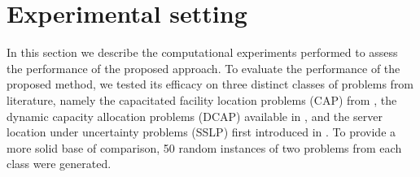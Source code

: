 \documentclass[preprint, 1p, review]{elsarticle}
\begin{document}
%

\section{Experimental setting} \label{sec5}

In this section we describe the computational experiments performed to assess the performance of the proposed approach. To evaluate the performance of the proposed method, we tested its efficacy on three distinct classes of problems from literature, namely the capacitated facility location problems (CAP) from \cite{boduretal2014}, the dynamic capacity allocation problems (DCAP) available in \cite{ahmedgarcia2003}, and the server location under uncertainty problems (SSLP) first introduced in \cite{ntaimosen2005}. To provide a more solid base of comparison, 50 random instances of two problems from each class were generated. 
\end{document}
